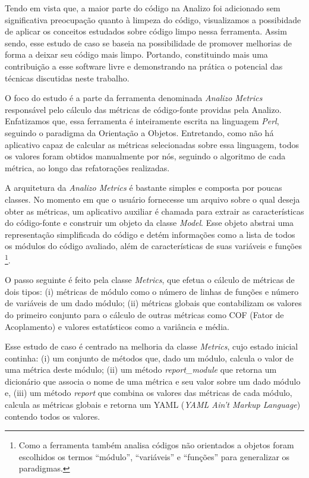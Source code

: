 Tendo em vista que, a maior parte do código na Analizo foi adicionado sem significativa
preocupação quanto à limpeza do código, visualizamos a possibidade de aplicar os conceitos
estudados sobre código limpo nessa ferramenta. Assim sendo, esse estudo de caso se baseia na
possibilidade de promover melhorias de forma a deixar seu código mais limpo. Portando,
constituindo mais uma contribuição a esse software livre e demonstrando na prática o
potencial das técnicas discutidas neste trabalho.

O foco do estudo é a parte da ferramenta denominada \textit{Analizo Metrics} responsável
pelo cálculo das métricas de código-fonte providas pela Analizo. Enfatizamos que,
essa ferramenta é inteiramente escrita na linguagem \textit{Perl}, seguindo o paradigma da
Orientação a Objetos. Entretando, como não há aplicativo capaz de calcular as métricas selecionadas
sobre essa linguagem, todos os valores foram obtidos manualmente por nós, seguindo o algoritmo
de cada métrica, ao longo das refatorações realizadas.

A arquitetura da \textit{Analizo Metrics} é bastante simples e composta por poucas classes.
No momento em que o usuário fornecesse um arquivo sobre o qual deseja obter as métricas, um aplicativo
auxiliar é chamada para extrair as características do código-fonte e construir um objeto da
classe \textit{Model}. Esse objeto abstrai uma representação simplificada do código e detém 
informações como a lista de todos os módulos do código avaliado, além de características
de suas variáveis e funções \footnote{Como a ferramenta também analisa códigos não orientados
a objetos foram escolhidos os termos ``módulo'', ``variáveis'' e ``funções'' para generalizar os 
paradigmas.}.

O passo seguinte é feito pela classe \textit{Metrics}, que efetua o cálculo de métricas de dois 
tipos: (i) métricas de módulo como o número de linhas de funções e número de variáveis de
um dado módulo; (ii) métricas globais que contabilizam os valores do primeiro conjunto para o
cálculo de outras métricas como COF (Fator de Acoplamento) e valores estatísticos como a variância e 
média.

Esse estudo de caso é centrado na melhoria da classe \textit{Metrics}, cujo estado inicial continha:
(i) um conjunto de métodos que, dado um módulo, calcula o valor de uma métrica deste módulo;
(ii) um método \textit{report\_module} que retorna um dicionário que associa o nome de uma métrica
e seu valor sobre um dado módulo e,  (iii) um método \textit{report} que combina os valores das métricas
de cada módulo, calcula as métricas globais e retorna um YAML (\textit{YAML Ain’t Markup Language}) 
contendo todos os valores.

